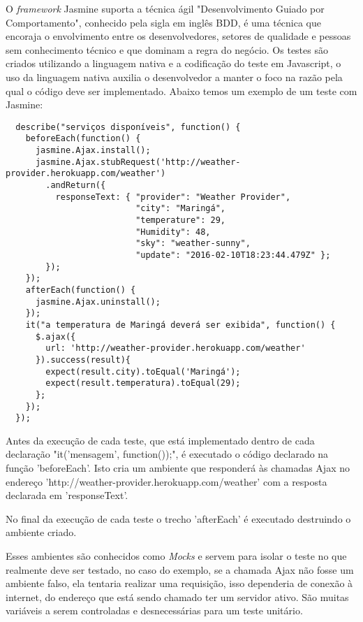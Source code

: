O \textit{framework} Jasmine suporta a técnica ágil "Desenvolvimento Guiado por Comportamento", conhecido pela sigla em inglês BDD, é uma técnica que encoraja o envolvimento entre os desenvolvedores, setores de qualidade e pessoas sem conhecimento técnico e que dominam a regra do negócio. Os testes são criados utilizando a linguagem nativa e a codificação do teste em Javascript, o uso da linguagem nativa auxilia o desenvolvedor a manter o foco na razão pela qual o código deve ser implementado.
Abaixo temos um exemplo de um teste com Jasmine:
\begin{footnotesize}
  \begin{verbatim}
  describe("serviços disponíveis", function() {
    beforeEach(function() {
      jasmine.Ajax.install();
      jasmine.Ajax.stubRequest('http://weather-provider.herokuapp.com/weather')
        .andReturn({
          responseText: { "provider": "Weather Provider",
                          "city": "Maringá",
                          "temperature": 29,
                          "Humidity": 48,
                          "sky": "weather-sunny",
                          "update": "2016-02-10T18:23:44.479Z" };
        });
    });
    afterEach(function() {
      jasmine.Ajax.uninstall();
    });
    it("a temperatura de Maringá deverá ser exibida", function() {
      $.ajax({
        url: 'http://weather-provider.herokuapp.com/weather'
      }).success(result){
        expect(result.city).toEqual('Maringá');
        expect(result.temperatura).toEqual(29);
      };
    });
  });
  \end{verbatim}
\end{footnotesize}

Antes da execução de cada teste, que está implementado dentro de cada declaração "it('mensagem', function(){});", é executado o código declarado na função 'beforeEach'. Isto cria um ambiente que responderá às chamadas Ajax no endereço 'http://weather-provider.herokuapp.com/weather' com a resposta declarada em 'responseText'.

No final da execução de cada teste o trecho 'afterEach' é executado destruindo o ambiente criado.

Esses ambientes são conhecidos como \textit{Mocks} e servem para isolar o teste no que realmente deve ser testado, no caso do exemplo, se a chamada Ajax não fosse um ambiente falso, ela tentaria realizar uma requisição, isso dependeria de conexão à internet, do endereço que está sendo chamado ter um servidor ativo. São muitas variáveis a serem controladas e desnecessárias para um teste unitário.

